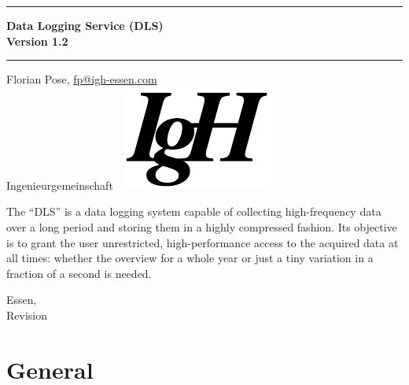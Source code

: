 \documentclass[a4paper,12pt,BCOR6mm,bibtotoc,idxtotoc]{scrbook}
\newcommand{\IgH}{\raisebox{-0.7667ex}\
    {\includegraphics[height=2.2ex]{bilder/ighsign}}}
\begin{document}


 \pagestyle{empty}

\begin{titlepage} \begin{center} \rule{\textwidth}{1.5mm}

{\Huge\bf Data Logging Service (DLS)\\[1ex] Version 1.2}

\vspace{1ex}

\rule{\textwidth}{1.5mm}

\vspace{\fill}

{\Large Florian Pose, \url{fp@igh-essen.com}\\[1ex]
    Ingenieurgemeinschaft \IgH}

\vspace{\fill}

The ``DLS'' is a data logging system capable of collecting high-frequency data
over a long period and storing them in a highly compressed fashion. Its
objective is to grant the user unrestricted, high-performance access to the
acquired data at all times: whether the overview for a whole year or just a
tiny variation in a fraction of a second is needed.

\vspace{\fill}

{\large Essen, \rcsInfoLongDate\\[1ex] Revision \rcsInfoRevision}

\end{center}
\end{titlepage}



\pagestyle{scrheadings}

\tableofcontents



\chapter{General}
\label{sec:allg}
\end{document}
